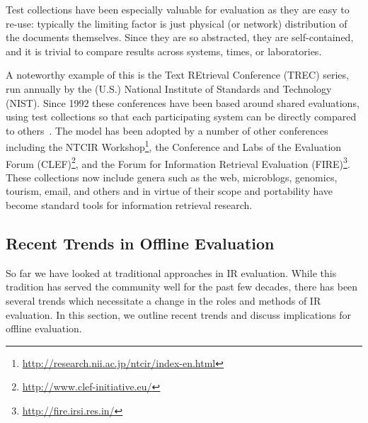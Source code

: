 %


Test collections have been especially valuable for evaluation as they are easy to re-use: typically the limiting factor is just physical (or network) distribution of the documents themselves. Since they are so abstracted, they are self-contained, and it is trivial to compare results across systems, times, or laboratories.

A noteworthy example of this is the Text REtrieval Conference (TREC) series, run annually by the (U.S.) National Institute of Standards and Technology (NIST). Since 1992 these conferences have been based around shared evaluations, using test collections so that each participating system can be directly compared to others~\cite{voor:trec05}. The model has been adopted by a number of other conferences including the NTCIR Workshop\footnote{\url{http://research.nii.ac.jp/ntcir/index-en.html}}, the Conference and Labs of the Evaluation Forum (CLEF)\footnote{\url{http://www.clef-initiative.eu/}}, and the Forum for Information Retrieval Evaluation (FIRE)\footnote{\url{http://fire.irsi.res.in/}}. These collections now include genera such as the web, microblogs, genomics, tourism, email, and others and in virtue of their scope and portability have become standard tools for information retrieval research.

\subsection{Recent Trends in Offline Evaluation}

So far we have looked at traditional approaches in IR evaluation. While this tradition has served the community well for the past few decades, there has been several trends which necessitate a change in the roles and methods of IR evaluation. In this section, we outline recent trends and discuss implications for offline evaluation.

